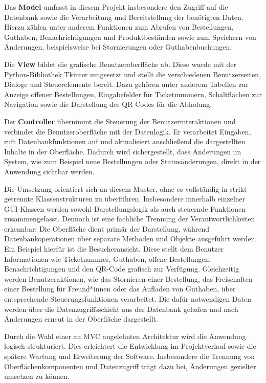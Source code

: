 Das \textbf{Model} umfasst in diesem Projekt insbesondere den Zugriff auf die Datenbank sowie die Verarbeitung und Bereitstellung der benötigten Daten.
Hierzu zählen unter anderem Funktionen zum Abrufen von Bestellungen, Guthaben, Benachrichtigungen und Produktbeständen sowie zum Speichern von Änderungen,
beispielsweise bei Stornierungen oder Guthabenbuchungen.

Die \textbf{View} bildet die grafische Benutzeroberfläche ab. Diese wurde mit der Python-Bibliothek Tkinter umgesetzt und stellt die verschiedenen Benutzerseiten,
Dialoge und Steuerelemente bereit. Dazu gehören unter anderem Tabellen zur Anzeige offener Bestellungen, Eingabefelder für Ticketnummern, Schaltflächen zur Navigation
sowie die Darstellung des \acs{QR}-Codes für die Abholung.

Der \textbf{Controller} übernimmt die Steuerung der Benutzerinteraktionen und verbindet die Benutzeroberfläche mit der Datenlogik. Er verarbeitet Eingaben, ruft
Datenbankfunktionen auf und aktualisiert anschließend die dargestellten Inhalte in der Oberfläche. Dadurch wird sichergestellt, dass Änderungen im System, wie
zum Beispiel neue Bestellungen oder Statusänderungen, direkt in der Anwendung sichtbar werden.

Die Umsetzung orientiert sich an diesem Muster, ohne es vollständig in strikt getrennte Klassenstrukturen zu überführen. Insbesondere innerhalb einzelner
\acs{GUI}-Klassen werden sowohl Darstellungslogik als auch steuernde Funktionen zusammengefasst. Dennoch ist eine fachliche Trennung der Verantwortlichkeiten erkennbar:
Die Oberfläche dient primär der Darstellung, während Datenbankoperationen über separate Methoden und Objekte ausgeführt werden.
Ein Beispiel hierfür ist die Besucheransicht. Diese stellt dem Benutzer Informationen wie Ticketnummer, Guthaben, offene Bestellungen, Benachrichtigungen und
den \acs{QR}-Code grafisch zur Verfügung. Gleichzeitig werden Benutzeraktionen, wie das Stornieren einer Bestellung, das Freischalten einer Bestellung für Freund*innen
oder das Aufladen von Guthaben, über entsprechende Steuerungsfunktionen verarbeitet. Die dafür notwendigen Daten werden über die Datenzugriffsschicht aus der Datenbank
geladen und nach Änderungen erneut in der Oberfläche dargestellt.

Durch die Wahl einer an \acs{MVC} angelehnten Architektur wird die Anwendung logisch strukturiert. Dies erleichtert die Entwicklung im Projektverlauf sowie die spätere
Wartung und Erweiterung der Software. Insbesondere die Trennung von Oberflächenkomponenten und Datenzugriff trägt dazu bei, Änderungen gezielter umsetzen zu können.

